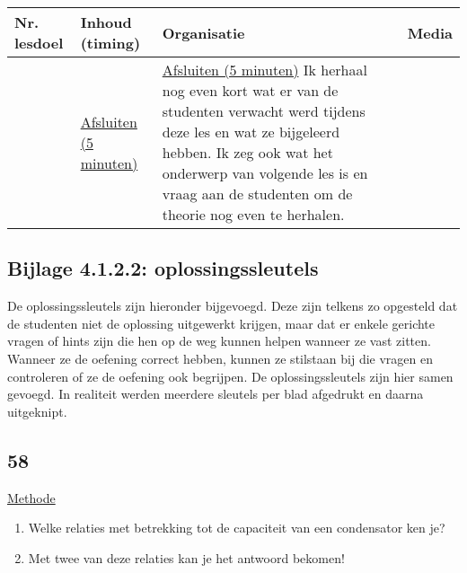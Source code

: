 \begin{landscape}
	


\begin{tabularx}{1.56\textwidth}{|p{1.5cm}|p{6cm}|X|p{4cm}|}
	\hline
	\textbf{Nr. lesdoel } & \textbf{Inhoud (timing)}  & \textbf{Organisatie } & \textbf{Media } \\ \hline
	&\underline{Afsluiten (5 minuten)}\newline 
	&  \underline{Afsluiten (5 minuten)}\newline
	Ik herhaal nog even kort wat er van de studenten verwacht werd tijdens deze les en wat ze bijgeleerd hebben. Ik zeg ook wat het onderwerp van volgende les is en vraag aan de studenten om de theorie nog even te herhalen.
	& 
	\\ \hline
\end{tabularx}
	
	
	
	
	
\end{landscape}





\subsection*{Bijlage 4.1.2.2: oplossingssleutels}
De oplossingssleutels zijn hieronder bijgevoegd. Deze zijn telkens zo opgesteld dat de studenten niet de oplossing uitgewerkt krijgen, maar dat er enkele gerichte vragen of hints zijn die hen op de weg kunnen helpen wanneer ze vast zitten. Wanneer ze de oefening correct hebben, kunnen ze stilstaan bij die vragen en controleren of ze de oefening ook begrijpen.\newline
De oplossingssleutels zijn hier samen gevoegd. In realiteit werden meerdere sleutels per blad afgedrukt en daarna uitgeknipt.

\subsection*{58}
\underline{Methode}
\begin{enumerate}
	\item Welke relaties met betrekking tot de capaciteit van een condensator ken je? 
	\item Met twee van deze relaties kan je het antwoord bekomen!
\end{enumerate}

